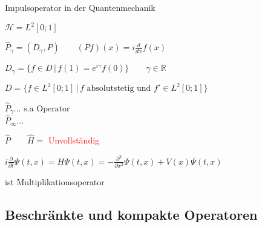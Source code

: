 \begin{Bsp}{Impulsoperator in der Quantenmechanik}

    $\mathcal{H} = L^2[0;1]$

    $\hat{P}_\gamma = (D_\gamma , P) \qquad (Pf)(x) = i \frac{d}{dx} f(x)$

    $D_\gamma =  \{ f \in D \, | \, f(1) = e^{i \gamma} f(0) \} \qquad \gamma \in \mathbb{R}$

    $D = \{ f \in L^2[0;1] \, | \, f \textrm{ absolutstetig und } f' \in L^2[0;1] \}$

    $\hat{P}_\gamma \dots \textrm{ s.a Operator}$ \\
    $\hat{P}_\infty \dots$
    
    $\hat{P} \qquad \hat{H} = $ \textcolor{red}{Unvollständig}

    $i \frac{\partial}{\partial t} \Psi (t,x) = H \Psi (t,x) = - \frac{\partial^2}{\partial x^2}
            \Psi (t,x) + V(x) \Psi (t,x)$

    \hspace{25px}
        	 ist Multiplikationsoperator
\end{Bsp}



\subsection{Beschränkte und kompakte Operatoren}













